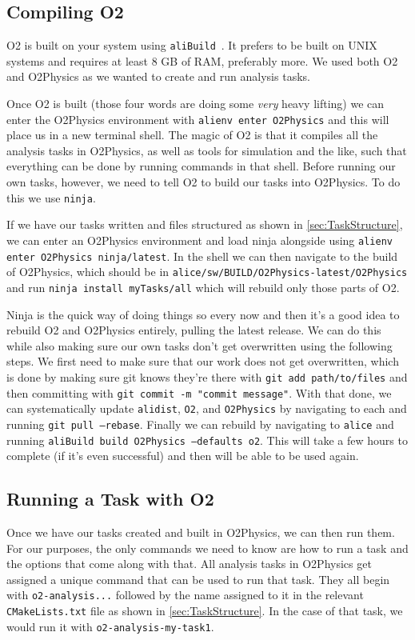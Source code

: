 \subsection{Compiling O2}\label{sec:CompileO2}
O2 is built on your system using \texttt{aliBuild}~\cite{aliBuild_install}. It prefers to be built on UNIX systems and requires at least 8 GB of RAM, preferably more. We used both O2 and O2Physics as we wanted to create and run analysis tasks. 

Once O2 is built (those four words are doing some \textit{very} heavy lifting) we can enter the O2Physics environment with \texttt{alienv enter O2Physics} and this will place us in a new terminal shell. The magic of O2 is that it compiles all the analysis tasks in O2Physics, as well as tools for simulation and the like, such that everything can be done by running commands in that shell. Before running our own tasks, however, we need to tell O2 to build our tasks into O2Physics. To do this we use \texttt{ninja}.

If we have our tasks written and files structured as shown in \cref{sec:TaskStructure}, we can enter an O2Physics environment and load ninja alongside using \texttt{alienv enter O2Physics ninja/latest}. In the shell we can then navigate to the build of O2Physics, which should be in \texttt{alice/sw/BUILD\-/O2Physics-latest/O2Physics} and run \texttt{ninja install myTasks/all} which will rebuild only those parts of O2. 

Ninja is the quick way of doing things so every now and then it's a good idea to rebuild O2 and O2Physics entirely, pulling the latest release. We can do this while also making sure our own tasks don't get overwritten using the following steps. We first need to make sure that our work does not get overwritten, which is done by making sure git knows they're there with \texttt{git add path/to/files} and then committing with \texttt{git commit -m "commit message"}. With that done, we can systematically update \texttt{alidist}, \texttt{O2}, and \texttt{O2Physics} by navigating to each and running \texttt{git pull --rebase}. Finally we can rebuild by navigating to \texttt{alice} and running \texttt{aliBuild build O2Physics --defaults o2}. This will take a few hours to complete (if it's even successful) and then will be able to be used again.

\subsection{Running a Task with O2}\label{sec:RunO2}
Once we have our tasks created and built in O2Physics, we can then run them. For our purposes, the only commands we need to know are how to run a task and the options that come along with that. All analysis tasks in O2Physics get assigned a unique command that can be used to run that task. They all begin with \texttt{o2-analysis...} followed by the name assigned to it in the relevant \texttt{CMakeLists.txt} file as shown in \cref{sec:TaskStructure}. In the case of that task, we would run it with \texttt{o2-analysis-my-task1}. 

